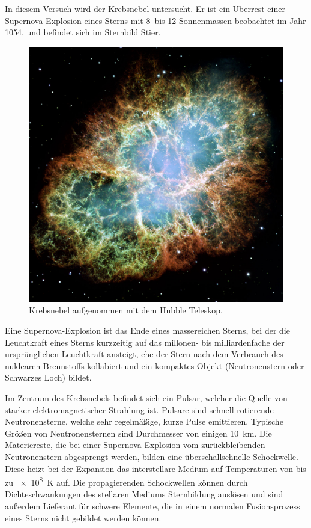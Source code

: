 In diesem Versuch wird der Krebsnebel untersucht.
Er ist ein Überrest einer Supernova-Explosion eines Sterns
mit 8~bis 12 Sonnenmassen beobachtet im Jahr 1054,
und befindet sich im Sternbild Stier.

\begin{figure}
		\includegraphics[width=\linewidth]{pictures/crab.jpg}
		\caption{Krebsnebel aufgenommen mit dem Hubble Teleskop.}%
    \label{fig:crab}
\end{figure}

Eine Supernova-Explosion ist das Ende eines massereichen Sterns,
bei der die Leuchtkraft eines Sterns kurzzeitig auf das millonen- bis
milliardenfache der ursprünglichen Leuchtkraft ansteigt,
ehe der Stern nach dem Verbrauch des
nuklearen Brennstoffs kollabiert und ein kompaktes Objekt
(Neutronenstern oder Schwarzes Loch) bildet.

Im Zentrum des Krebsnebels befindet sich ein Pulsar,
welcher die Quelle von starker elektromagnetischer Strahlung ist.
Pulsare sind schnell rotierende Neutronensterne,
welche sehr regelmäßige, kurze Pulse emittieren.
Typische Größen von Neutronensternen sind Durchmesser von einigen
\SI{10}{\kilo\meter}.
Die Materiereste, die bei einer Supernova-Explosion
vom zurückbleibenden Neutronenstern abgesprengt werden,
bilden eine überschallschnelle Schockwelle.
Diese heizt bei der Expansion das interstellare Medium auf Temperaturen von bis zu
\SI{e8}{\kelvin} auf.
Die propagierenden Schockwellen können durch Dichteschwankungen des stellaren
Mediums Sternbildung auslösen
und sind außerdem Lieferant für schwere Elemente, die in einem normalen
Fusionsprozess eines Sterns nicht gebildet werden können.

